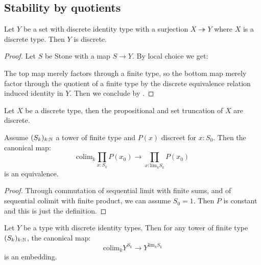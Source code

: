\subsection{Stability by quotients}

\begin{lemma}
Let $Y$ be a set with discrete identity type with a surjection $X\twoheadrightarrow Y$ where $X$ is a discrete type. Then $Y$ is discrete.
\end{lemma}

\begin{proof}
Let $S$ be Stone with a map $S\to Y$. By local choice we get:
 \begin{center}
\end{center}
The top map merely factors through a finite type, so the bottom map merely factor through the quotient of a finite type by the discrete equivalence relation induced identity in $Y$. Then we conclude by .
\end{proof}

\begin{corollary}\label{prop-set-truncation-discrete}
Let $X$ be a discrete type, then the propositional and set truncation of $X$ are discrete.
\end{corollary}

\begin{lemma}\label{discrete-continuity-dependent}
Assume $(S_k)_{k:\mathbb{N}}$ a tower of finite type and $P(x)$ discreet for $x:S_0$. Then the canonical map:
\[\mathrm{colim}_k\prod_{x:S_k}P(x_0) \to \prod_{x:\mathrm{lim}_kS_k}P(x_0)\]
is an equivalence.
\end{lemma}

\begin{proof}
Through commutation of sequential limit with finite sums, and of sequential colimit with finite product, we can assume $S_0 = 1$. Then $P$ is constant and this is just the definition.
\end{proof}

\begin{lemma}\label{discrete-identity-embedding}
Let $Y$ be a type with discrete identity types. Then for any tower of finite type $(S_k)_{k:\mathbb{N}}$, the canonical map:
\[\mathrm{colim}_kY^{S_k} \to Y^{\mathrm{lim}_kS_k}\]
is an embedding.
\end{lemma}

